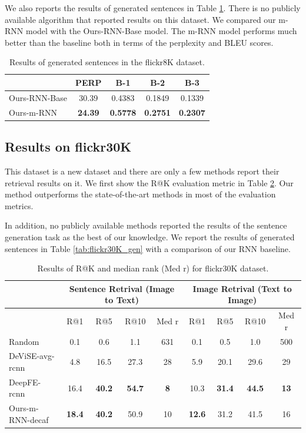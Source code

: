 We also reports the results of generated sentences in Table \ref{tab:flickr8K_gen}.
There is no publicly available algorithm that reported results on this dataset.
We compared our m-RNN model with the Ours-RNN-Base model.
The m-RNN model performs much better than the baseline both in terms of the perplexity and BLEU scores.

\begin{table}[htb]
	\centering
\begin{tabular}{l|cccc}
\hline
      & PERP  & B-1   & B-2   & B-3 \\
\hline
Ours-RNN-Base & 30.39 & 0.4383 & 0.1849 & 0.1339 \\
Ours-m-RNN & \textbf{24.39} & \textbf{0.5778} & \textbf{0.2751} & \textbf{0.2307} \\
\hline
\end{tabular}%
	\caption{Results of generated sentences in the flickr8K dataset. }
	\label{tab:flickr8K_gen}
\end{table}

\subsection{Results on flickr30K}

This dataset is a new dataset and there are only a few methods report their retrieval results on it.
We first show the R@K evaluation metric in Table \ref{tab:flickr30K_ret}.
Our method outperforms the state-of-the-art methods in most of the evaluation metrics.

In addition, no publicly available methods reported the results of the sentence generation task as the best of our knowledge.
We report the results of generated sentences in Table \ref{tab:flickr30K_gen} with a comparison of our RNN baseline.

\begin{table}[htb]
	\centering
\begin{tabular}{l|cccc|cccc}
\hline
      & \multicolumn{4}{c|}{Sentence Retrival (Image to Text)} & \multicolumn{4}{c}{Image Retrival (Text to Image)} \\
\hline
      & R@1   & R@5   & R@10  & Med r & R@1   & R@5   & R@10  & Med r \\
Random & 0.1   & 0.6   & 1.1   & 631   & 0.1   & 0.5   & 1.0   & 500 \\
DeViSE-avg-rcnn \cite{frome2013devise} & 4.8   & 16.5  & 27.3  & 28    & 5.9   & 20.1  & 29.6  & 29 \\
DeepFE-rcnn \cite{karpathy2014fragment} & 16.4  & \textbf{40.2} & \textbf{54.7} & \textbf{8} & 10.3  & \textbf{31.4} & \textbf{44.5} & \textbf{13} \\
Ours-m-RNN-decaf & \textbf{18.4} & \textbf{40.2} & 50.9  & 10    & \textbf{12.6} & 31.2  & 41.5  & 16 \\
\hline
\end{tabular}%
	\caption{Results of R@K and median rank (Med r) for flickr30K dataset.}
	\label{tab:flickr30K_ret}
\end{table}

